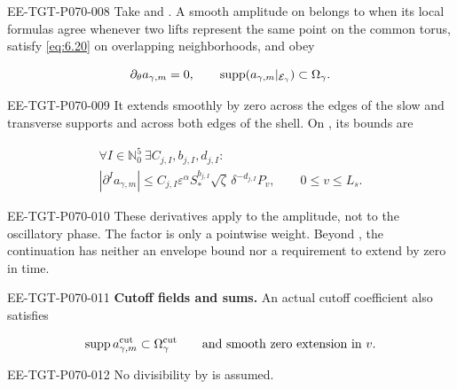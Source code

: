 \begin{definition}\label{def:6.5}
\begin{EESegment}{EE-TGT-P070-008}
Take  and . A smooth amplitude  on  belongs to  when its local formulas agree whenever two lifts represent the same point on the common torus, satisfy \eqref{eq:6.20} on overlapping neighborhoods, and obey
\end{EESegment}
\[
  \partial_\theta a_{\gamma,m}=0,
  \qquad
  \operatorname{supp}(a_{\gamma,m}|_{\mathcal E_\gamma})\subset\Omega_\gamma.
\]
\begin{EESegment}{EE-TGT-P070-009}
It extends smoothly by zero across the edges of the slow and transverse supports and across both edges of the shell. On , its bounds are
\end{EESegment}
\begin{equation}
  \begin{gathered}
    \forall I\in\mathbb N_0^5\ \exists C_{j,I},b_{j,I},d_{j,I}:\\
    |\partial^Ia_{\gamma,m}|\le C_{j,I}\varepsilon^\alpha
      S_*^{b_{j,I}}\sqrt\zeta\,\delta^{-d_{j,I}}P_v,
    \qquad 0\le v\le L_s.
  \end{gathered}
  \tag{6.29}\label{eq:6.29}
\end{equation}
\begin{EESegment}{EE-TGT-P070-010}
These derivatives apply to the amplitude, not to the oscillatory phase. The factor  is only a pointwise weight. Beyond , the continuation has neither an envelope bound nor a requirement to extend by zero in time.
\end{EESegment}
\end{definition}

\begin{EESegment}{EE-TGT-P070-011}
\textbf{Cutoff fields and sums.} An actual cutoff coefficient also satisfies
\end{EESegment}
\[
  \operatorname{supp} a_{\gamma,m}^{\mathrm{cut}}\subset\Omega_\gamma^{\mathrm{cut}}
  \qquad\text{and smooth zero extension in }v.
\]
\begin{EESegment}{EE-TGT-P070-012}
No divisibility by  is assumed.
\end{EESegment}

